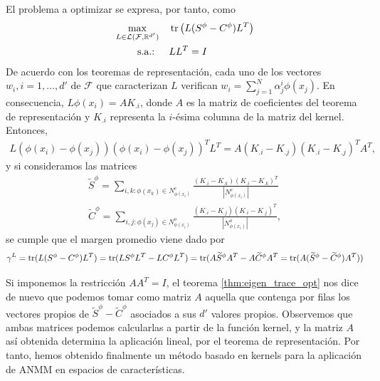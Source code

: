 El problema a optimizar se expresa, por tanto, como
\begin{equation}
\begin{split}
    \max_{L \in \mathcal{L}(\mathcal{F},\mathbb{R}^{d'})} &\quad \operatorname{tr}\left(L(S^{\phi}-C^{\phi})L^T\right)  \\
    \text{s.a.: } &\quad LL^T = I
\end{split}
\end{equation}
De acuerdo con los teoremas de representación, cada uno de los vectores $w_i, i = 1,\dots,d'$ de $\mathcal{F}$ que caracterizan $L$ verifican $w_i = \sum_{j=1}^N \alpha_j^i \phi(x_j)$. En consecuencia, $L\phi(x_i) = AK_{.i}$, donde $A$ es la matriz de coeficientes del teorema de representación y $K_{.i}$ representa la $i$-ésima columna de la matriz del kernel. Entonces,
\begin{equation*}
    \begin{split}
        L(\phi(x_i)-\phi(x_j))(\phi(x_i)-\phi(x_j))^TL^T = A(K_{.i}-K_{.j})(K_{.i}-K_{.j})^TA^T,
    \end{split}
\end{equation*}
y si consideramos las matrices
\begin{align*}
    \widetilde{S}^{\phi} = \sum\limits_{i,k \colon \phi(x_k) \in N_{\phi(x_i)}^e} \frac{(K_{.i}-K_{.k})(K_{.i}-K_{.k})^T}{|N_{\phi(x_i)}^e|} \\
    \widetilde{C}^{\phi} = \sum\limits_{i,j \colon \phi(x_j) \in N_{\phi(x_i)}^o} \frac{(K_{.i}-K_{.j})(K_{.i}-K_{.j})^T}{|N_{\phi(x_i)}^o|},
\end{align*}
se cumple que el margen promedio viene dado por
\begin{equation*}
    \gamma^L = \operatorname{tr}(L(S^{\phi}-C^{\phi})L^T) = \operatorname{tr}(LS^{\phi}L^T-LC^{\phi}L^T) = \operatorname{tr}(A \widetilde{S}^{\phi} A^T - A\widetilde{C}^{\phi}A^T = \operatorname{tr}(A(\widetilde{S}^{\phi}-\widetilde{C}^{\phi})A^T))
\end{equation*} 

Si imponemos la restricción $AA^T = I$, el teorema \ref{thm:eigen_trace_opt} nos dice de nuevo que podemos tomar como matriz $A$ aquella que contenga por filas los vectores propios de $\widetilde{S}^{\phi}-\widetilde{C}^{\phi}$ asociados a sus $d'$ valores propios. Observemos que ambas matrices podemos calcularlas a partir de la función kernel, y la matriz $A$ así obtenida determina la aplicación lineal, por el teorema de representación. Por tanto, hemos obtenido finalmente un método basado en kernels para la aplicación de ANMM en espacios de características.

